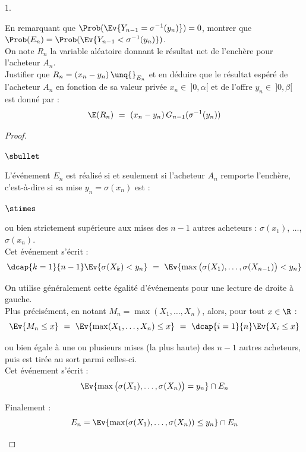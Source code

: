 \begin{noliste}{1.}
  \setlength{\itemsep}{4mm}
  \setcounter{enumi}{9}
  \item En remarquant que $\Prob(\Ev{Y_{n-1} = \sigma^{-1}(y_n)}) = 0$,
  montrer que $\Prob(E_n) = \Prob(\Ev{Y_{n-1} < \sigma^{-1}(y_n)})$.\\
  On note $R_n$ la variable aléatoire donnant le résultat net de 
  l'enchère pour l'acheteur $A_n$.\\
  Justifier que $R_n = (x_n-y_n) \, \unq{}_{E_n}$ et en déduire que le 
  résultat espéré de l'acheteur $A_n$ en fonction de sa valeur 
  privée $x_n \in \ ]0,\alpha[$ et de l'offre $y_n \in \ ]0,\beta[$ 
  est donné par :
  \[
    \E(R_n) \ = \ (x_n-y_n) \, G_{n-1}(\sigma^{-1}(y_n))
  \]
  
  
  \newpage
  
  
  \begin{proof}~
    \begin{noliste}{$\sbullet$}
      \item L'événement $E_n$ est réalisé si et seulement si 
      l'acheteur $A_n$ remporte l'enchère, c'est-à-dire si sa mise 
      $y_n = \sigma(x_n)$ est :
      \begin{noliste}{$\stimes$}
	\item ou bien strictement supérieure aux mises des 
	$n-1$ autres acheteurs : $\sigma(x_1)$, $\ldots$, 
	$\sigma(x_n)$.\\
	Cet événement s'écrit :
	\[
	  \dcap{k=1}{n-1} \Ev{\sigma(X_k) < y_n}
	  \ = \ \Ev{\max\big( \sigma(X_1), \ldots, \sigma(X_{n-1})\big)
	  < y_n}
	\]
	\begin{remark}
	  On utilise généralement cette égalité d'événements pour une
	  lecture de droite à gauche.\\
	  Plus précisément,
	  en notant $M_n = \max(X_1, \ldots, X_n)$, alors, pour tout 
	  $x \in \R$ :
	  \[
	    \Ev{M_n \leq x} \ = \ \Ev{\max(X_1, \ldots, X_n) \leq x}
	    \ = \ \dcap{i=1}{n} \Ev{X_i \leq x}
	  \]
	\end{remark}
	
	\item ou bien égale à une ou plusieurs mises (la plus haute) 
	des $n-1$ 
	autres acheteurs, puis est tirée au sort parmi celles-ci.\\
	Cet événement s'écrit :
	\[
	  \Ev{\max\big( \sigma(X_1), \ldots, \sigma(X_n)\big)
	  = y_n} \cap E_n
	\]
      \end{noliste}
      Finalement :
      \[
        E_n = \Ev{\max(\sigma(X_1) , \ldots, \sigma(X_n)) \leq 
        y_n} \cap E_n
      \]
      

\end{noliste}
\end{proof}
\end{noliste}
